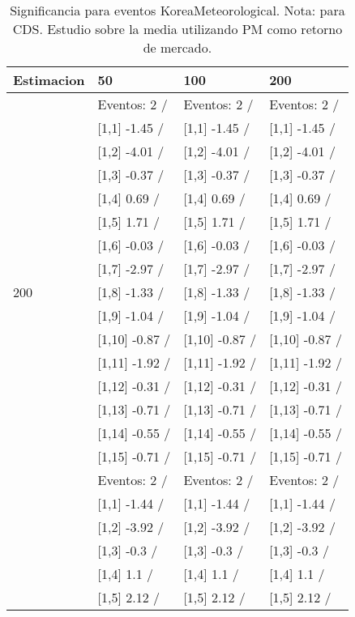 \begin{table}

\caption{Significancia para eventos KoreaMeteorological. Nota: para CDS. Estudio sobre la media utilizando PM como retorno de mercado.}
\centering
\begin{tabular}[t]{llll}
\toprule
Estimacion & 50 & 100 & 200\\
\midrule
 & Eventos:  2 / & Eventos:  2 / & Eventos:  2 /\\
 & {}[1,1] -1.45  / & {}[1,1] -1.45  / & {}[1,1] -1.45  /\\
 & {}[1,2] -4.01  / & {}[1,2] -4.01  / & {}[1,2] -4.01  /\\
 & {}[1,3] -0.37  / & {}[1,3] -0.37  / & {}[1,3] -0.37  /\\
 & {}[1,4] 0.69  / & {}[1,4] 0.69  / & {}[1,4] 0.69  /\\
\addlinespace
 & {}[1,5] 1.71  / & {}[1,5] 1.71  / & {}[1,5] 1.71  /\\
 & {}[1,6] -0.03  / & {}[1,6] -0.03  / & {}[1,6] -0.03  /\\
 & {}[1,7] -2.97  / & {}[1,7] -2.97  / & {}[1,7] -2.97  /\\
200 & {}[1,8] -1.33  / & {}[1,8] -1.33  / & {}[1,8] -1.33  /\\
 & {}[1,9] -1.04  / & {}[1,9] -1.04  / & {}[1,9] -1.04  /\\
\addlinespace
 & {}[1,10] -0.87  / & {}[1,10] -0.87  / & {}[1,10] -0.87  /\\
 & {}[1,11] -1.92  / & {}[1,11] -1.92  / & {}[1,11] -1.92  /\\
 & {}[1,12] -0.31  / & {}[1,12] -0.31  / & {}[1,12] -0.31  /\\
 & {}[1,13] -0.71  / & {}[1,13] -0.71  / & {}[1,13] -0.71  /\\
 & {}[1,14] -0.55  / & {}[1,14] -0.55  / & {}[1,14] -0.55  /\\
\addlinespace
 & {}[1,15] -0.71  / & {}[1,15] -0.71  / & {}[1,15] -0.71  /\\
 & Eventos:  2 / & Eventos:  2 / & Eventos:  2 /\\
 & {}[1,1] -1.44  / & {}[1,1] -1.44  / & {}[1,1] -1.44  /\\
 & {}[1,2] -3.92  / & {}[1,2] -3.92  / & {}[1,2] -3.92  /\\
 & {}[1,3] -0.3  / & {}[1,3] -0.3  / & {}[1,3] -0.3  /\\
\addlinespace
 & {}[1,4] 1.1  / & {}[1,4] 1.1  / & {}[1,4] 1.1  /\\
 & {}[1,5] 2.12  / & {}[1,5] 2.12  / & {}[1,5] 2.12  /\\

\end{tabular}
\end{table}
